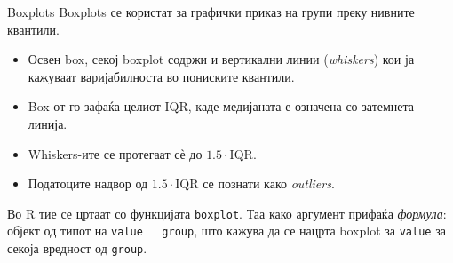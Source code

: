 \documentclass[hyperref={unicode}, xcolor={svgnames, table},
usepdftitle=false]{beamer}
\theoremstyle{remark}
\begin{document}
\begin{frame}{Boxplots}
  Boxplots се користат за графички приказ на групи преку нивните квантили.
  \begin{itemize}
  \item Освен box, секој boxplot содржи и вертикални линии (\emph{whiskers}) кои
    ја кажуваат варијабилноста во пониските квантили.
  \item Box-от го зафаќа целиот IQR, каде медијаната е означена со затемнета
    линија.
  \item Whiskers-ите се протегаат сѐ до \(1.5 \cdot \mathrm{IQR}\).
  \item Податоците надвор од \(1.5 \cdot \mathrm{IQR}\) се познати како
    \emph{outliers}.
  \end{itemize}

  Во R тие се цртаат со функцијата \texttt{boxplot}.  Таа како аргумент
  прифаќа \emph{формула}: објект од типот на \texttt{value ~ group}, што
  кажува да се нацрта boxplot за \texttt{value} за секоја вредност од
  \texttt{group}.
\end{frame}
\end{document}
